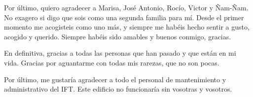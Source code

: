 Por último, quiero agradecer a Marisa, José Antonio, Rocío, Victor y Ñam-Ñam. No exagero si digo que sois como una segunda familia para mí. Desde el primer momento me acogisteis como uno más, y siempre me habéis hecho sentir a gusto, acogido y querido. Siempre habéis sido amables y buenos conmigo, gracias.

En definitiva, gracias a todas las personas que han pasado y que están en mi vida. Gracias por aguantarme con todas mis rarezas, que no son pocas. 

Por último, me gustaría agradecer a todo el personal de mantenimiento y administrativo del IFT. Este edificio no funcionaría sin vosotras y vosotros.

\bigskip

\endgroup
